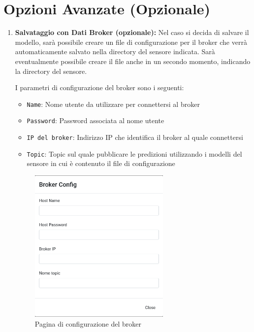 \documentclass{rapportECL}
\begin{document}
\section{Opzioni Avanzate (Opzionale)}
\begin{enumerate}
  \item \textbf{Salvataggio con Dati Broker (opzionale):} Nel caso si decida di salvare il modello, sarà possibile creare un file di configurazione 
  per il broker che verrà automaticamente salvato nella directory del sensore indicata. Sarà eventualmente possibile creare il file anche in un secondo momento,
  indicando la directory del sensore. 
  
I parametri di configurazione del broker sono i seguenti:
  
  \begin{itemize}
    \item \texttt{Name}: Nome utente da utilizzare per connettersi al broker
    \item \texttt{Password}: Password associata al nome utente
    \item \texttt{IP del broker}: Indirizzo IP che identifica il broker al quale connettersi
    \item \texttt{Topic}: Topic sul quale pubblicare le predizioni utilizzando i modelli del sensore in cui è contenuto il file di configurazione
  \end{itemize}


\begin{figure}[htp]
  \centering
  \includegraphics[width=0.65\textwidth]{images/img10.png}
  \caption{Pagina di configurazione del broker}
\end{figure}

\end{enumerate}
\end{document}
